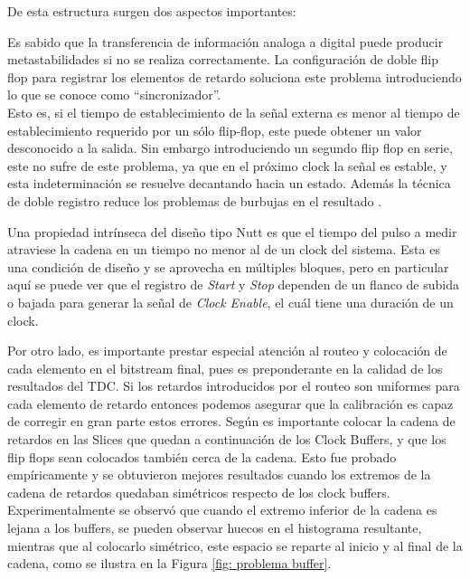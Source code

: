 De esta estructura surgen dos aspectos importantes:
\begin{bangenumerate}
     \item Es sabido que la transferencia de información analoga a digital puede producir metastabilidades si no se 
     realiza correctamente. La configuración de doble flip flop para registrar los elementos de retardo soluciona
     este problema introduciendo lo que se conoce como ``sincronizador''. \\
     Esto es, si el tiempo de establecimiento de la señal
     externa es menor al tiempo de establecimiento requerido por un sólo flip-flop, este puede obtener
     un valor desconocido a la salida. Sin embargo introduciendo un segundo flip flop en serie, este no sufre
     de este problema, ya que en el próximo clock la señal es estable, y esta indeterminación se resuelve
     decantando hacia un estado. Además la técnica de doble registro reduce los problemas de burbujas
     en el resultado \cite{machado_novel_2018}.

     \item Una propiedad intrínseca del diseño tipo Nutt es que el tiempo del pulso a medir
     atraviese la cadena en un tiempo no menor al de un clock del sistema. Esta es una condición de diseño
     y se aprovecha en múltiples bloques, pero en particular aquí
     se puede ver que el registro de \textit{Start} y \textit{Stop} dependen de un flanco de subida o bajada para
     generar la señal de \textit{Clock Enable}, el cuál tiene una duración de un clock.
\end{bangenumerate}

Por otro lado, es importante prestar especial atención al routeo y colocación de cada elemento en el bitstream final,
pues es preponderante en la calidad de los resultados del TDC. Si los retardos introducidos por el routeo son 
uniformes para cada elemento de retardo entonces podemos asegurar que la calibración es capaz de corregir
en gran parte estos errores. Según \cite{machado_novel_2018} es importante colocar la cadena de retardos en las Slices
que quedan a continuación de los Clock Buffers, y que los flip flops sean colocados también cerca de la cadena. Esto
fue probado empíricamente y se obtuvieron mejores resultados cuando los extremos de la cadena de retardos quedaban simétricos
respecto de los clock buffers.\\
Experimentalmente se observó que cuando el extremo inferior de la cadena es lejana a los buffers, 
se pueden observar huecos en el histograma resultante, mientras que al colocarlo simétrico, este espacio
se reparte al inicio y al final de la cadena, como se ilustra en la Figura \ref{fig: problema buffer}.

